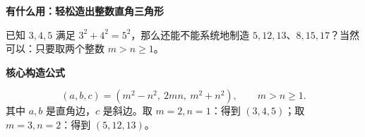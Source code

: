 \clearpage
\begin{statementbox}
\textbf{\textcolor{CStatement}{有什么用：轻松造出整数直角三角形}}
\par\medskip
\begin{center}

\end{center}
\medskip
已知 $3,4,5$ 满足 $3^2+4^2=5^2$，那么还能不能系统地制造 $5,12,13$、$8,15,17$？当然可以：只要取两个整数 $m>n\ge1$。
\end{statementbox}
\clearpage
\begin{statementbox}
\textbf{\textcolor{CStatement}{核心构造公式}}
\par\medskip
\begin{center}

\end{center}
\medskip
\[\boxed{(a,b,c)=(m^2-n^2,\ 2mn,\ m^2+n^2)},\qquad m>n\ge1.\]其中 $a,b$ 是直角边，$c$ 是斜边。取 $m=2,n=1$：得到 $(3,4,5)$；取 $m=3,n=2$：得到 $(5,12,13)$。
\end{statementbox}
